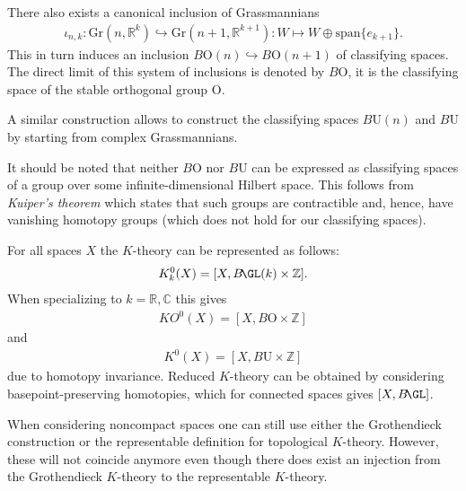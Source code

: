 {\begin{property}
        There also exists a canonical inclusion of Grassmannians
        \begin{gather}
            \iota_{n,k}:\mathrm{Gr}(n,\mathbb{R}^k)\hookrightarrow \mathrm{Gr}(n+1,\mathbb{R}^{k+1}):W\mapsto W\oplus\mathrm{span}\{e_{k+1}\}.
        \end{gather}
        This in turn induces an inclusion $B\mathrm{O}(n)\hookrightarrow B\mathrm{O}(n+1)$ of classifying spaces. The direct limit of this system of inclusions is denoted by $B\mathrm{O}$, it is the classifying space of the stable orthogonal group $\mathrm{O}$.
    \end{property}
    \begin{remark}
        A similar construction allows to construct the classifying spaces $B\mathrm{U}(n)$ and $B\mathrm{U}$ by starting from complex Grassmannians.
    \end{remark}
    \begin{remark}\label{k:kuiper_remark}
        It should be noted that neither $B\mathrm{O}$ nor $B\mathrm{U}$ can be expressed as classifying spaces of a group over some infinite-dimensional Hilbert space. This follows from \textit{Kuiper's theorem} which states that such groups are contractible and, hence, have vanishing homotopy groups (which does not hold for our classifying spaces).
    \end{remark}

    \begin{property}
        For all spaces $X$ the $K$-theory can be represented as follows:
        \begin{gather}
            K^0_k(X) = [X,B\!\GL(k)\times\mathbb{Z}].
        \end{gather}
        When specializing to $k=\mathbb{R},\mathbb{C}$ this gives
        \begin{gather}
            KO^0(X) = [X,B\mathrm{O}\times\mathbb{Z}]
        \end{gather}
        and
        \begin{gather}
            K^0(X) = [X,B\mathrm{U}\times\mathbb{Z}]
        \end{gather}
        due to homotopy invariance. Reduced $K$-theory can be obtained by considering basepoint-preserving homotopies, which for connected spaces gives $[X,B\!\GL]$.
    \end{property}

    \begin{remark}
        When considering noncompact spaces one can still use either the Grothendieck construction or the representable definition for topological $K$-theory. However, these will not coincide anymore even though there does exist an injection from the Grothendieck $K$-theory to the representable $K$-theory.
    \end{remark}

}
